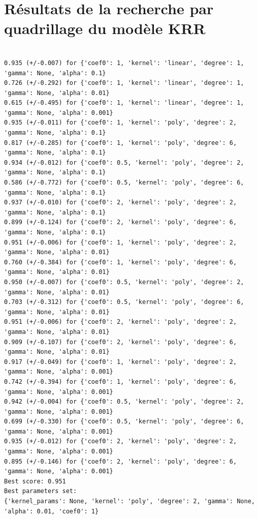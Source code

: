 \chapter{Résultats de la recherche par quadrillage du modèle KRR}

\begin{verbatim}

0.935 (+/-0.007) for {'coef0': 1, 'kernel': 'linear', 'degree': 1, 'gamma': None, 'alpha': 0.1}
0.726 (+/-0.292) for {'coef0': 1, 'kernel': 'linear', 'degree': 1, 'gamma': None, 'alpha': 0.01}
0.615 (+/-0.495) for {'coef0': 1, 'kernel': 'linear', 'degree': 1, 'gamma': None, 'alpha': 0.001}
0.935 (+/-0.011) for {'coef0': 1, 'kernel': 'poly', 'degree': 2, 'gamma': None, 'alpha': 0.1}
0.817 (+/-0.285) for {'coef0': 1, 'kernel': 'poly', 'degree': 6, 'gamma': None, 'alpha': 0.1}
0.934 (+/-0.012) for {'coef0': 0.5, 'kernel': 'poly', 'degree': 2, 'gamma': None, 'alpha': 0.1}
0.586 (+/-0.772) for {'coef0': 0.5, 'kernel': 'poly', 'degree': 6, 'gamma': None, 'alpha': 0.1}
0.937 (+/-0.010) for {'coef0': 2, 'kernel': 'poly', 'degree': 2, 'gamma': None, 'alpha': 0.1}
0.899 (+/-0.124) for {'coef0': 2, 'kernel': 'poly', 'degree': 6, 'gamma': None, 'alpha': 0.1}
0.951 (+/-0.006) for {'coef0': 1, 'kernel': 'poly', 'degree': 2, 'gamma': None, 'alpha': 0.01}
0.760 (+/-0.384) for {'coef0': 1, 'kernel': 'poly', 'degree': 6, 'gamma': None, 'alpha': 0.01}
0.950 (+/-0.007) for {'coef0': 0.5, 'kernel': 'poly', 'degree': 2, 'gamma': None, 'alpha': 0.01}
0.703 (+/-0.312) for {'coef0': 0.5, 'kernel': 'poly', 'degree': 6, 'gamma': None, 'alpha': 0.01}
0.951 (+/-0.006) for {'coef0': 2, 'kernel': 'poly', 'degree': 2, 'gamma': None, 'alpha': 0.01}
0.909 (+/-0.107) for {'coef0': 2, 'kernel': 'poly', 'degree': 6, 'gamma': None, 'alpha': 0.01}
0.917 (+/-0.049) for {'coef0': 1, 'kernel': 'poly', 'degree': 2, 'gamma': None, 'alpha': 0.001}
0.742 (+/-0.394) for {'coef0': 1, 'kernel': 'poly', 'degree': 6, 'gamma': None, 'alpha': 0.001}
0.942 (+/-0.004) for {'coef0': 0.5, 'kernel': 'poly', 'degree': 2, 'gamma': None, 'alpha': 0.001}
0.699 (+/-0.330) for {'coef0': 0.5, 'kernel': 'poly', 'degree': 6, 'gamma': None, 'alpha': 0.001}
0.935 (+/-0.012) for {'coef0': 2, 'kernel': 'poly', 'degree': 2, 'gamma': None, 'alpha': 0.001}
0.895 (+/-0.146) for {'coef0': 2, 'kernel': 'poly', 'degree': 6, 'gamma': None, 'alpha': 0.001}
Best score: 0.951
Best parameters set:
{'kernel_params': None, 'kernel': 'poly', 'degree': 2, 'gamma': None, 'alpha': 0.01, 'coef0': 1}
\end{verbatim}


